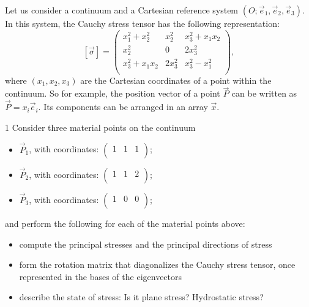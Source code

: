 \newcommand{\NoteType}{Assignment 1: State of Stress}
\newcommand{\TheDate}{March 8, 2026}


  
  \newpage

  \begin{probdef}
    Let us consider a continuum and a Cartesian reference system $(O; \Vec{e}_1, \Vec{e}_2, \Vec{e}_3)$.
    In this system, the Cauchy stress tensor has the following representation:
    \begin{equation*}
      \left[ \Vec{\sigma} \right] = \begin{pmatrix}
        x_1^2 + x_2^2 & x_2^2 & x_3^2 + x_1 x_2\\
      x_2^2 & 0 & 2x_3^2\\
      x_3^2 + x_1 x_2 & 2x_3^2 & x_3^2 - x_1^2\\
      \end{pmatrix}
    ,\end{equation*}
    where $(x_1, x_2, x_3)$ are the Cartesian coordinates of a point within the continuum.
    So for example, the position vector of a point $\Vec{P}$ can be written as $\Vec{P} = x_i \Vec{e}_i$.
    Its components can be arranged in an array $\Vec{x}$.
  \end{probdef}

  \begin{problem}{1}
    Consider three material points on the continuum
    \begin{itemize}
      \item $\Vec{P}_1$, with coordinates: $\begin{pmatrix}
        1 & 1 & 1\\
      \end{pmatrix}$;
      \item $\Vec{P}_2$, with coordinates: $\begin{pmatrix}
        1 & 1 & 2\\
      \end{pmatrix}$;
      \item $\Vec{P}_3$, with coordinates: $\begin{pmatrix}
        1 & 0 & 0\\
      \end{pmatrix}$;
    \end{itemize}
    and perform the following for each of the material points above:
    \begin{itemize}
      \item compute the principal stresses and the principal directions of stress
      \item form the rotation matrix that diagonalizes the Cauchy stress tensor, once represented in the bases of the eigenvectors
      \item describe the state of stress: Is it plane stress? Hydrostatic stress?
    \end{itemize}
  \end{problem}

